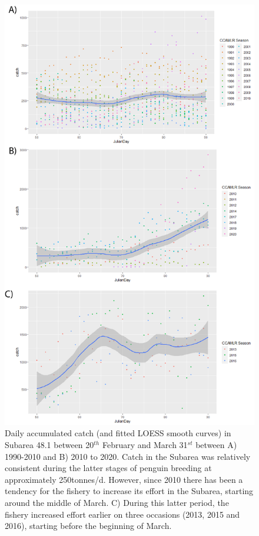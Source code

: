 \documentclass[]{elsarticle} %
\begin{document}
\begin{figure}
\includegraphics[width=1\linewidth]{./Watters EMM figures/48.1 catches in march} \caption{Daily accumulated catch (and fitted LOESS smooth curves) in Subarea 48.1 between 20$^{th}$ February and March 31$^{st}$ between A) 1990-2010 and B) 2010 to 2020. Catch in the Subarea was relatively consistent during the latter stages of penguin breeding at approximately 250tonnes/d.  However, since 2010 there has been a tendency for the fishery to increase its effort in the Subarea, starting around the middle of March. C) During this latter period, the fishery increased effort earlier on three occasions (2013, 2015 and 2016), starting before the beginning of March.}\label{fig:March Subarea 48.1 fishing plot}
\end{figure}


\end{document}
